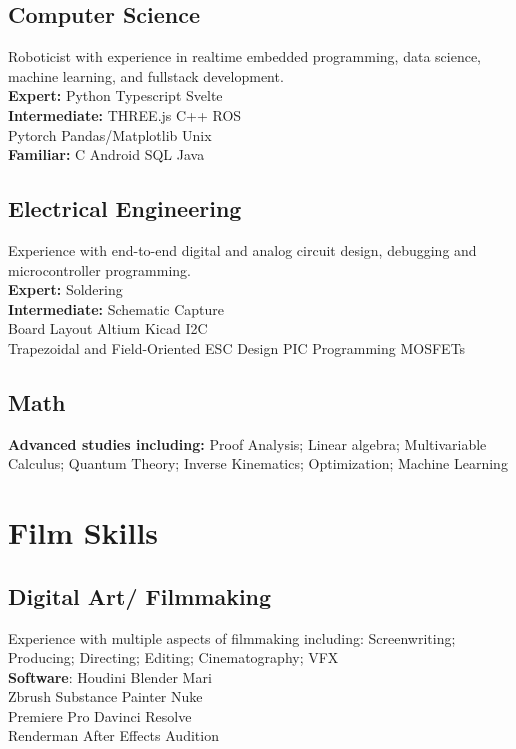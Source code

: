 \documentclass[]{deedy-long-resume}
\begin{document}
\begin{paracol}{2}
\subsection{Computer Science\hfill}
Roboticist with experience
in realtime embedded programming, data science, machine learning, 
and fullstack development. \\
\textbf{Expert:} Python \textbullet{} Typescript  \textbullet{}
 Svelte \\
\textbf{Intermediate:} THREE.js \textbullet{} C++ \textbullet{} ROS \\ 
Pytorch \textbullet{} Pandas/Matplotlib \textbullet{} Unix \\
\textbf{Familiar:}
C \textbullet{} Android \textbullet{} SQL \textbullet{} Java
\sectionsep

\subsection{Electrical Engineering\hfill}
Experience with end-to-end digital and analog circuit design, debugging and microcontroller programming. \\ 
\textbf{Expert:} Soldering \\ 
\textbf{Intermediate:}
Schematic Capture \\
Board Layout \textbullet{} Altium \textbullet{} Kicad \textbullet{} I2C \\
Trapezoidal and Field-Oriented ESC Design \textbullet{} PIC Programming \textbullet{} MOSFETs
\sectionsep

\subsection{Math}
\textbf{Advanced studies including:} Proof Analysis; Linear algebra; Multivariable Calculus; Quantum Theory; Inverse Kinematics; Optimization; Machine Learning
\sectionsep

\newpage





\section{Film Skills}

\subsection{Digital Art/ Filmmaking\hfill}
Experience with multiple aspects of filmmaking including: Screenwriting; Producing; Directing; Editing; Cinematography; VFX \\
\textbf{Software}: Houdini \textbullet{} Blender \textbullet{} Mari \\ 
Zbrush \textbullet{} Substance Painter \textbullet{} Nuke \\
Premiere Pro \textbullet{} Davinci Resolve \\ Renderman \textbullet{} After Effects \textbullet{} Audition
\sectionsep


\end{paracol}
\end{document}

